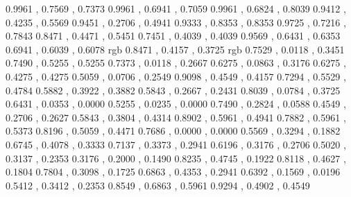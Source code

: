 \definecolor{ikkonzome}{rgb}	{	0.9961	,	0.7569	,	0.7373	}
\definecolor{ishitake}{rgb}	{	0.9961	,	0.6941	,	0.7059	}
\definecolor{momo}{rgb}	        {	0.9961	,	0.6824	,	0.8039	}
\definecolor{kobai}{rgb}	{	0.9412	,	0.4235	,	0.5569	}
\definecolor{nakabeni}{rgb}	{	0.9451	,	0.2706	,	0.4941	}
\definecolor{sakura}{rgb}	{	0.9333	,	0.8353	,	0.8353	}
\definecolor{arazome}{rgb}	{	0.9725	,	0.7216	,	0.7843	}
\definecolor{usubeni}{rgb}	{	0.8471	,	0.4471	,	0.5451	}
\definecolor{hisame}{rgb}	{	0.7451	,	0.4039	,	0.4039	}
\definecolor{toki}{rgb}	        {	0.9569	,	0.6431	,	0.6353	}
\definecolor{sakuranezumi}{rgb}	{	0.6941	,	0.6039	,	0.6078	}
\definecolor{sango}	{rgb}	{	0.8471	,	0.4157	,	0.3725	}
\definecolor{akane}	{rgb}	{	0.7529	,	0.0118	,	0.3451	}
\definecolor{choshun}{rgb}	{	0.7490	,	0.5255	,	0.5255	}
\definecolor{karakurenai}{rgb}	{	0.7373	,	0.0118	,	0.2667	}
\definecolor{enji}{rgb}	        {	0.6275	,	0.0863	,	0.3176	}
\definecolor{keshiaka}{rgb}	{	0.6275	,	0.4275	,	0.4275	}
\definecolor{kokiake}{rgb}	{	0.5059	,	0.0706	,	0.2549	}
\definecolor{jinzamomi}{rgb}	{	0.9098	,	0.4549	,	0.4157	}
\definecolor{mizugaki}{rgb}	{	0.7294	,	0.5529	,	0.4784	}
\definecolor{umenezumi}{rgb}	{	0.5882	,	0.3922	,	0.3882	}
\definecolor{suoko}{rgb}        {	0.5843	,	0.2667	,	0.2431	}
\definecolor{akabeni}{rgb}	{	0.8039	,	0.0784	,	0.3725	}
\definecolor{shinshu}{rgb}	{	0.6431	,	0.0353	,	0.0000	}
\definecolor{azuki}{rgb}	{	0.5255	,	0.0235	,	0.0000	}
\definecolor{ginshu}{rgb}	{	0.7490	,	0.2824	,	0.0588	}
\definecolor{ebicha}{rgb}	{	0.4549	,	0.2706	,	0.2627	}
\definecolor{kuriume}{rgb}	{	0.5843	,	0.3804	,	0.4314	}
\definecolor{akebono}{rgb}	{	0.8902	,	0.5961	,	0.4941	}
\definecolor{hanezu}{rgb}	{	0.7882	,	0.5961	,	0.5373	}
\definecolor{sangoshu}{rgb}	{	0.8196	,	0.5059	,	0.4471	}
\definecolor{shozyohi}{rgb}	{	0.7686	,	0.0000	,	0.0000	}
\definecolor{shikancha}{rgb}	{	0.5569	,	0.3294	,	0.1882	}
\definecolor{kakishibu}{rgb}	{	0.6745	,	0.4078	,	0.3333	}
\definecolor{benikaba}{rgb}	{	0.7137	,	0.3373	,	0.2941	}
\definecolor{benitobi}{rgb}	{	0.6196	,	0.3176	,	0.2706	}
\definecolor{benihihada}{rgb}	{	0.5020	,	0.3137	,	0.2353	}
\definecolor{kurotobi}{rgb}	{	0.3176	,	0.2000	,	0.1490	}
\definecolor{benihi}{rgb}	{	0.8235	,	0.4745	,	0.1922	}
\definecolor{terigaki}{rgb}	{	0.8118	,	0.4627	,	0.1804	}
\definecolor{ake}{rgb}	        {	0.7804	,	0.3098	,	0.1725	}
\definecolor{edocha}{rgb}	{	0.6863	,	0.4353	,	0.2941	}
\definecolor{bengara}{rgb}	{	0.6392	,	0.1569	,	0.0196	}
\definecolor{hihada}{rgb}	{	0.5412	,	0.3412	,	0.2353	}
\definecolor{shishi}{rgb}	{	0.8549	,	0.6863	,	0.5961	}
\definecolor{araishu}{rgb}	{	0.9294	,	0.4902	,	0.4549	}
